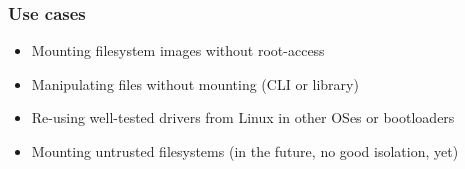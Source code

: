 

\begin{frame}

    \frametitle{Use cases}
    
        \begin{itemize}
            \item Mounting filesystem images without root-access
            \item Manipulating files without mounting (CLI or library)
            \item Re-using well-tested drivers from Linux in other OSes or bootloaders
            \item Mounting untrusted filesystems (in the future, no good isolation, yet)
        \end{itemize}

\end{frame}